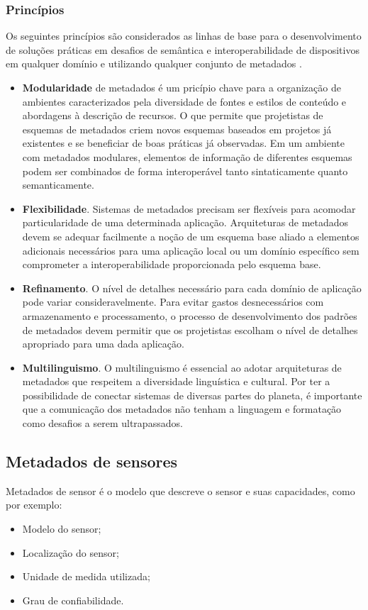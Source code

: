 		\subsubsection{Princípios}
    \quad Os seguintes princípios são considerados as linhas de base para o desenvolvimento de soluções práticas em desafios de semântica
    e interoperabilidade de dispositivos em qualquer domínio e utilizando qualquer conjunto de metadados \cite{metadata}.
		\begin{itemize}
		  \item \textbf{Modularidade} de metadados é um pricípio chave para a organização de ambientes caracterizados pela diversidade de fontes e estilos
      de conteúdo e abordagens à descrição de recursos. O que permite que projetistas de esquemas de metadados criem novos esquemas baseados em projetos
      já existentes e se beneficiar de boas práticas já observadas. Em um ambiente com metadados modulares, elementos de informação de diferentes esquemas
      podem ser combinados de forma interoperável tanto sintaticamente quanto semanticamente.
      \item \textbf{Flexibilidade}. Sistemas de metadados precisam ser flexíveis para acomodar particularidade de uma determinada aplicação.
      Arquiteturas de metadados devem se adequar facilmente a noção de um esquema base aliado a elementos adicionais necessários para uma aplicação local ou um
      domínio específico sem comprometer a interoperabilidade proporcionada pelo esquema base.
      \item \textbf{Refinamento}. O nível de detalhes necessário para cada domínio de aplicação pode variar consideravelmente. Para evitar gastos
      desnecessários com armazenamento e processamento, o processo de desenvolvimento dos padrões de metadados devem permitir que os projetistas
      escolham o nível de detalhes apropriado para uma dada aplicação.
      \item \textbf{Multilinguismo}. O multilinguismo é essencial ao adotar arquiteturas de metadados que respeitem a diversidade linguística e cultural.
      Por ter a possibilidade de conectar sistemas de diversas partes do planeta, é importante que a comunicação dos metadados não tenham a linguagem e formatação
      como desafios a serem ultrapassados.
		\end{itemize}
  \subsection{Metadados de sensores}
    \quad Metadados de sensor é o modelo que descreve o sensor e suas capacidades, como por exemplo:
    \begin{itemize}
      \item Modelo do sensor;
      \item Localização do sensor;
      \item Unidade de medida utilizada;
      \item Grau de confiabilidade.
    \end{itemize}

